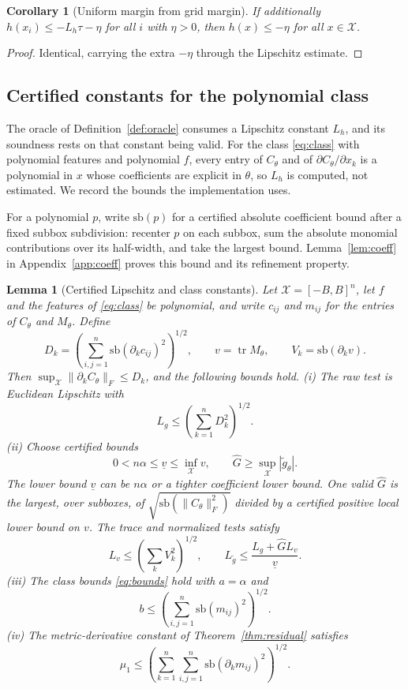 \documentclass[12pt,onecolumn,journal]{IEEEtran}
\newtheorem{lemma}{Lemma}
\newtheorem{corollary}{Corollary}
\newcommand{\X}{\mathcal{X}}
\providecommand{\tr}{}
\renewcommand{\tr}{\operatorname{tr}}
\begin{document}
\begin{corollary}[Uniform margin from grid margin]
\label{cor:margin}
If additionally $h(x_i) \le -L_h\tau - \eta$ for all $i$ with $\eta > 0$, then $h(x) \le -\eta$ for all $x \in \X$.
\end{corollary}

\begin{proof}
Identical, carrying the extra $-\eta$ through the Lipschitz estimate.
\end{proof}

\subsection{Certified constants for the polynomial class}
\label{sec:certconst}

The oracle of Definition~\ref{def:oracle} consumes a Lipschitz constant $L_h$, and its soundness rests on that constant being valid. For the class \eqref{eq:class} with polynomial features and polynomial $f$, every entry of $C_\theta$ and of $\partial C_\theta/\partial x_k$ is a polynomial in $x$ whose coefficients are explicit in $\theta$, so $L_h$ is computed, not estimated. We record the bounds the implementation uses.

For a polynomial $p$, write $\mathrm{sb}(p)$ for a certified absolute coefficient bound after a fixed subbox subdivision: recenter $p$ on each subbox, sum the absolute monomial contributions over its half-width, and take the largest bound. Lemma~\ref{lem:coeff} in Appendix~\ref{app:coeff} proves this bound and its refinement property.

\begin{lemma}[Certified Lipschitz and class constants]
\label{lem:certconst}
Let $\X=[-B,B]^n$, let $f$ and the features of \eqref{eq:class} be polynomial, and write $c_{ij}$ and $m_{ij}$ for the entries of $C_\theta$ and $M_\theta$. Define
\[
D_k=\left(\sum_{i,j=1}^n\mathrm{sb}(\partial_k c_{ij})^2\right)^{1/2},
\qquad
v=\tr M_\theta,
\qquad
V_k=\mathrm{sb}(\partial_k v).
\]
Then $\sup_\X\|\partial_k C_\theta\|_F\le D_k$, and the following bounds hold.
(i) The raw test is Euclidean Lipschitz with
\[
L_g\le\left(\sum_{k=1}^nD_k^2\right)^{1/2}.
\]
(ii) Choose certified bounds
\[
0<n\alpha\le\underline v\le\inf_\X v,
\qquad
\widehat G\ge\sup_\X|\tilde g_\theta|.
\]
The lower bound $\underline v$ can be $n\alpha$ or a tighter coefficient lower bound. One valid $\widehat G$ is the largest, over subboxes, of $\sqrt{\mathrm{sb}(\|C_\theta\|_F^2)}$ divided by a certified positive local lower bound on $v$. The trace and normalized tests satisfy
\[
L_v\le\left(\sum_kV_k^2\right)^{1/2},
\qquad
L_{\tilde g}\le\frac{L_g+\widehat G L_v}{\underline v}.
\]
(iii) The class bounds \eqref{eq:bounds} hold with $a=\alpha$ and
\[
b\le\left(\sum_{i,j=1}^n\mathrm{sb}(m_{ij})^2\right)^{1/2}.
\]
(iv) The metric-derivative constant of Theorem~\ref{thm:residual} satisfies
\[
\mu_1\le\left(\sum_{k=1}^n\sum_{i,j=1}^n\mathrm{sb}(\partial_k m_{ij})^2\right)^{1/2}.
\]
\end{lemma}
\end{document}
